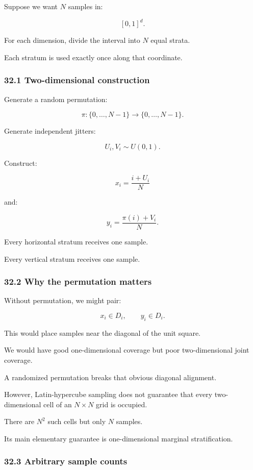 Suppose we want \(N\) samples in:

\[ [0,1]^d. \]

For each dimension, divide the interval into \(N\) equal strata.

Each stratum is used exactly once along that coordinate.

\subsubsection{32.1 Two-dimensional construction}\label{two-dimensional-construction}

Generate a random permutation:

\[ \pi:\{0,\ldots,N-1\}\rightarrow\{0,\ldots,N-1\}. \]

Generate independent jitters:

\[ U_i,V_i\sim U(0,1). \]

Construct:

\[ \boxed{ x_i=\frac{i+U_i}{N} } \]

and:

\[ \boxed{ y_i=\frac{\pi(i)+V_i}{N} }. \]

Every horizontal stratum receives one sample.

Every vertical stratum receives one sample.

\subsubsection{32.2 Why the permutation matters}\label{why-the-permutation-matters}

Without permutation, we might pair:

\[ x_i\in D_i,\qquad y_i\in D_i. \]

This would place samples near the diagonal of the unit square.

We would have good one-dimensional coverage but poor two-dimensional joint coverage.

A randomized permutation breaks that obvious diagonal alignment.

However, Latin-hypercube sampling does not guarantee that every two-dimensional cell of an \(N\times N\) grid is occupied.

There are \(N^2\) such cells but only \(N\) samples.

Its main elementary guarantee is one-dimensional marginal stratification.

\subsubsection{32.3 Arbitrary sample counts}\label{arbitrary-sample-counts}

